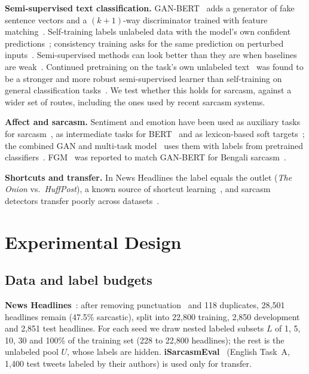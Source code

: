 \documentclass[conference]{IEEEtran}
\begin{document}
\textbf{Semi-supervised text classification.} GAN-BERT~\cite{croce2020ganbert} adds a generator of fake sentence vectors and a $(k{+}1)$-way discriminator trained with feature matching~\cite{salimans2016improved}. Self-training labels unlabeled data with the model's own confident predictions~\cite{lee2013pseudo}; consistency training asks for the same prediction on perturbed inputs~\cite{xie2020uda}. Semi-supervised methods can look better than they are when baselines are weak~\cite{oliver2018realistic}. Continued pretraining on the task's own unlabeled text~\cite{gururangan2020dont} was found to be a stronger and more robust semi-supervised learner than self-training on general classification tasks~\cite{shi2023rethinking}. We test whether this holds for sarcasm, against a wider set of routes, including the ones used by recent sarcasm systems.

\textbf{Affect and sarcasm.} Sentiment and emotion have been used as auxiliary tasks for sarcasm~\cite{chauhan2020sentiment}, as intermediate tasks for BERT~\cite{savini2022intermediate} and as lexicon-based soft targets~\cite{chen2022jointly}; the combined GAN and multi-task model~\cite{irfan2025seed} uses them with labels from pretrained classifiers~\cite{barbieri2020tweeteval,demszky2020goemotions}. FGM~\cite{miyato2017adversarial} was reported to match GAN-BERT for Bengali sarcasm~\cite{zihan2026fgm}.

\textbf{Shortcuts and transfer.} In News Headlines the label equals the outlet (\textit{The Onion} vs.\ \textit{HuffPost}), a known source of shortcut learning~\cite{gururangan2018annotation,geirhos2020shortcut}, and sarcasm detectors transfer poorly across datasets~\cite{jang2024generalizable}.

\section{Experimental Design}

\subsection{Data and label budgets}
\textbf{News Headlines}~\cite{misra2023sarcasm}: after removing punctuation~\cite{irfan2025seed} and 118 duplicates, 28,501 headlines remain (47.5\% sarcastic), split into 22,800 training, 2,850 development and 2,851 test headlines. For each seed we draw nested labeled subsets $L$ of 1, 5, 10, 30 and 100\% of the training set (228 to 22,800 headlines); the rest is the unlabeled pool $U$, whose labels are hidden. \textbf{iSarcasmEval}~\cite{abufarha2022semeval} (English Task~A, 1,400 test tweets labeled by their authors) is used only for transfer.
\end{document}
